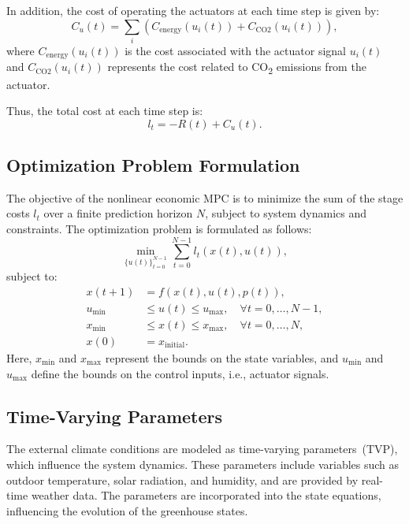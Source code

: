 \documentclass[conference]{IEEEtran}
\begin{document}
In addition, the cost of operating the actuators at each time step is given by:
\begin{equation}
    C_u(t) = \sum_{i} \left( C_{\text{energy}}(u_i(t)) + C_{\text{CO2}}(u_i(t)) \right),
\end{equation}
where \(C_{\text{energy}}(u_i(t))\) is the cost associated with the actuator signal \(u_i(t)\) and \(C_{\text{CO2}}(u_i(t))\) represents the cost related to CO\textsubscript{2} emissions from the actuator.

Thus, the total cost at each time step is:
\begin{equation}
    l_t = -R(t) + C_u(t).
\end{equation}

\subsection{Optimization Problem Formulation}

The objective of the nonlinear economic MPC is to minimize the sum of the stage costs \(l_t\) over a finite prediction horizon \(N\), subject to system dynamics and constraints. The optimization problem is formulated as follows:
\begin{equation}
    \min_{{\{u(t)\}}_{t=0}^{N-1}} \sum_{t=0}^{N-1} l_t(x(t), u(t)),
\end{equation}
subject to:
\begin{align}
    x(t+1)   & = f(x(t), u(t), p(t)),                           \\
    u_{\min} & \leq u(t) \leq u_{\max}, \quad \forall t = 0, \dots, N-1, \\
    x_{\min} & \leq x(t) \leq x_{\max}, \quad \forall t = 0, \dots, N,   \\
    x(0)     & = x_{\text{initial}}.
\end{align}
Here, \(x_{\min}\) and \(x_{\max}\) represent the bounds on the state variables, and \(u_{\min}\) and \(u_{\max}\) define the bounds on the control inputs, i.e., actuator signals.

\subsection{Time-Varying Parameters}

The external climate conditions are modeled as time-varying parameters~(TVP), which influence the system dynamics. These parameters include variables such as outdoor temperature, solar radiation, and humidity, and are provided by real-time weather data. The parameters are incorporated into the state equations, influencing the evolution of the greenhouse states.
\end{document}
